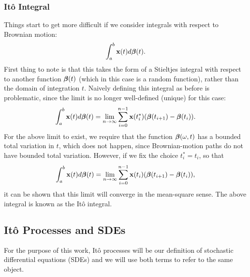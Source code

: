 \documentclass[a4paper,12pt,twoside,openright]{report}
\theoremstyle{definition}
\begin{document}
\subsubsection{Itô Integral}
Things start to get more difficult if we consider integrals with respect to Brownian motion:
\begin{align}\label{eq:brownian_integral}
    \int_{a}^b {\mathbf{x}}(t) d{\bm{\beta}}(t).
\end{align}
First thing to note is that this takes the form of a Stieltjes integral with respect to another function ${\bm{\beta}}(t)$ (which in this case is a random function), rather than the domain of integration $t$. Naively defining this integral as before is problematic, since the limit is no longer well-defined (unique) for this case:
\begin{align}\label{eq:brownian_integral_bad}
    \int_{a}^b {\mathbf{x}}(t) d{\bm{\beta}}(t) =\lim_{n \rightarrow \infty} \sum_{i=0}^{n-1} {\mathbf{x}}(t^{*}_i)({\bm{\beta}}(t_{i+1}) - {\bm{\beta}}(t_i)).
\end{align}
For the above limit to exist, we require that the function ${\bm{\beta}}(\omega, t)$ has a bounded total variation in $t$, which does not happen, since Brownian-motion paths do not have bounded total variation. However, if we fix the choice $t_i^{*} = t_i$, so that
\begin{align}\label{eq:ito_integral}
    \int_{a}^b {\mathbf{x}}(t) d{\bm{\beta}}(t) =\lim_{n \rightarrow \infty} \sum_{i=0}^{n-1} {\mathbf{x}}(t_i)({\bm{\beta}}(t_{i+1}) - {\bm{\beta}}(t_i)),
\end{align}
it can be shown that this limit will converge in the mean-square sense. The above integral is known as the Itô integral.
\subsection{Itô Processes and SDEs}

For the purpose of this work, Itô processes will be our definition of stochastic differential equations (SDEs) and we will use both terms to refer to the same object.
\end{document}

